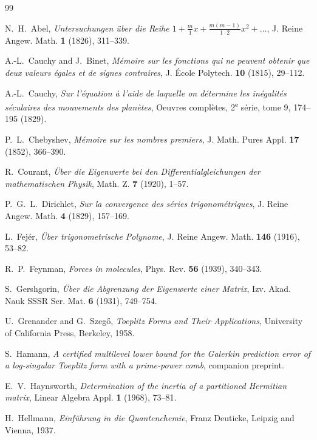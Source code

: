 \documentclass[11pt,a4paper]{article}
\theoremstyle{plain}
\theoremstyle{definition}
\begin{document}
\begin{thebibliography}{99}\small

 N.~H.~Abel,
\emph{Untersuchungen \"uber die Reihe
$1+\frac m1x+\frac{m(m-1)}{1\cdot2}x^{2}+\dots$},
J. Reine Angew. Math. \textbf{1} (1826), 311--339.

 A.-L.~Cauchy and J.~Binet,
\emph{M\'emoire sur les fonctions qui ne peuvent obtenir que deux valeurs
\'egales et de signes contraires},
J. \'Ecole Polytech. \textbf{10} (1815), 29--112.

 A.-L.~Cauchy,
\emph{Sur l'\'equation \`a l'aide de laquelle on d\'etermine les
in\'egalit\'es s\'eculaires des mouvements des plan\`etes},
Oeuvres compl\`etes, 2\textsuperscript{e} s\'erie, tome 9, 174--195 (1829).

 P.~L.~Chebyshev,
\emph{M\'emoire sur les nombres premiers},
J. Math. Pures Appl. \textbf{17} (1852), 366--390.

 R.~Courant,
\emph{\"Uber die Eigenwerte bei den Differentialgleichungen der
mathematischen Physik},
Math. Z. \textbf{7} (1920), 1--57.

 P.~G.~L.~Dirichlet,
\emph{Sur la convergence des s\'eries trigonom\'etriques},
J. Reine Angew. Math. \textbf{4} (1829), 157--169.

 L.~Fej\'er,
\emph{\"Uber trigonometrische Polynome},
J. Reine Angew. Math. \textbf{146} (1916), 53--82.

 R.~P.~Feynman,
\emph{Forces in molecules},
Phys. Rev. \textbf{56} (1939), 340--343.

 S.~Gershgorin,
\emph{\"Uber die Abgrenzung der Eigenwerte einer Matrix},
Izv. Akad. Nauk SSSR Ser. Mat. \textbf{6} (1931), 749--754.

 U.~Grenander and G.~Szeg\H{o},
\emph{Toeplitz Forms and Their Applications},
University of California Press, Berkeley, 1958.

 S.~Hamann,
\emph{A certified multilevel lower bound for the Galerkin prediction error of a
log-singular Toeplitz form with a prime-power comb}, companion preprint.

 E.~V.~Haynsworth,
\emph{Determination of the inertia of a partitioned Hermitian matrix},
Linear Algebra Appl. \textbf{1} (1968), 73--81.

 H.~Hellmann,
\emph{Einf\"uhrung in die Quantenchemie},
Franz Deuticke, Leipzig and Vienna, 1937.


\end{thebibliography}
\end{document}
